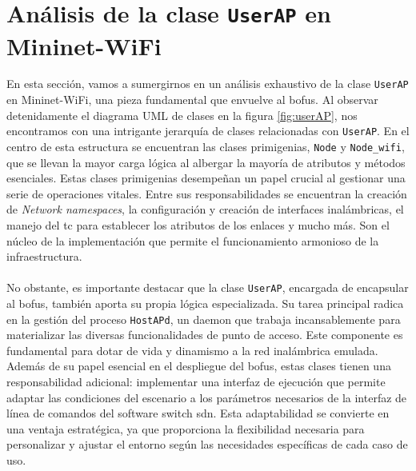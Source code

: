 \section{Análisis de la clase \texttt{UserAP} en Mininet-WiFi}
\label{sec:ana_userap}

En esta sección, vamos a sumergirnos en un análisis exhaustivo de la clase \texttt{UserAP} en Mininet-WiFi, una pieza fundamental que envuelve al \gls{bofus}. Al observar detenidamente el diagrama UML de clases en la figura \ref{fig:userAP}, nos encontramos con una intrigante jerarquía de clases relacionadas con \texttt{UserAP}. En el centro de esta estructura se encuentran las clases primigenias, \texttt{Node} y \texttt{Node\_wifi}, que se llevan la mayor carga lógica al albergar la mayoría de atributos y métodos esenciales. Estas clases primigenias desempeñan un papel crucial al gestionar una serie de operaciones vitales. Entre sus responsabilidades se encuentran la creación de \textit{Network namespaces}, la configuración y creación de interfaces inalámbricas, el manejo del \gls{tc} para establecer los atributos de los enlaces y mucho más. Son el núcleo de la implementación que permite el funcionamiento armonioso de la infraestructura.\\
\\
No obstante, es importante destacar que la clase \texttt{UserAP}, encargada de encapsular al \gls{bofus}, también aporta su propia lógica especializada. Su tarea principal radica en la gestión del proceso \texttt{HostAPd}, un daemon que trabaja incansablemente para materializar las diversas funcionalidades de punto de acceso. Este componente es fundamental para dotar de vida y dinamismo a la red inalámbrica emulada. Además de su papel esencial en el despliegue del \gls{bofus}, estas clases tienen una responsabilidad adicional: implementar una interfaz de ejecución que permite adaptar las condiciones del escenario a los parámetros necesarios de la interfaz de línea de comandos del software switch \gls{sdn}. Esta adaptabilidad se convierte en una ventaja estratégica, ya que proporciona la flexibilidad necesaria para personalizar y ajustar el entorno según las necesidades específicas de cada caso de uso.
